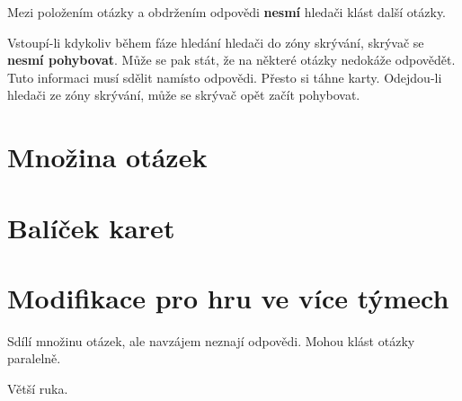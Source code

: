 \documentclass{book}
\begin{document}
Mezi položením otázky a obdržením odpovědi \textbf{nesmí} hledači klást další otázky.

Vstoupí-li kdykoliv během fáze hledání hledači do zóny skrývání, skrývač se \textbf{nesmí pohybovat}. Může se pak stát, že na některé otázky nedokáže odpovědět. Tuto informaci musí sdělit namísto odpovědi. Přesto si táhne karty. Odejdou-li hledači ze zóny skrývání, může se skrývač opět začít pohybovat.

\section{Množina otázek}\label{otázky}

\section{Balíček karet}\label{karty}

\section{Modifikace pro hru ve více týmech}\label{týmy}

Sdílí množinu otázek, ale navzájem neznají odpovědi. Mohou klást otázky paralelně.

Větší ruka.
\end{document}
